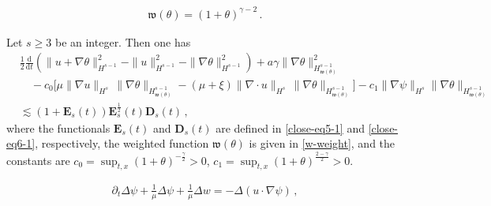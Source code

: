 \documentclass[10pt,a4paper]{amsart}
\def\d{\mathrm{d}}
\def\w{\mathfrak{w}}
\begin{document}
\begin{equation}\label{w-weight}
  \begin{aligned}
    \w (\theta) = (1 + \theta)^{\gamma - 2} \,.
  \end{aligned}
\end{equation}

\begin{lemma}\label{Lmm-G6}
    Let $s \ge 3$ be an integer. Then one has
\begin{equation}\label{theta-eq-estimate}
\begin{aligned}
&\frac{1}{2} \frac{\d}{\d t} \left( \|u + \nabla \theta\|_{H^{s-1}}^2 - \|u\|_{H^{s-1}}^2 - \|\nabla \theta\|_{H^{s-1}}^2 \right) + a \gamma \|\nabla \theta\|^2_{H^{s-1}_{\w (\theta)}} \\
& \quad - c_0 \big[ \mu \| \nabla u \|_{H^s} \, \| \nabla \theta \|_{H^{s-1}_{\w (\theta)}} - (\mu + \xi ) \| \nabla \cdot u \|_{H^s} \, \| \nabla \theta \|_{H^{s-1}_{\w (\theta)}} \big] - c_1 \|\nabla \psi\|_{H^s} \|\nabla \theta\|_{H^{s-1}_{\w (\theta)}} \\
& \lesssim \left( 1 + \mathbf{E}_s (t) \right) \mathbf{E}_s^\frac{1}{2} (t) \mathbf{D}_s (t) \,,
\end{aligned}
\end{equation}
where the functionals $\mathbf{E}_s (t)$ and $\mathbf{D}_s (t)$ are defined  in \eqref{close-eq5-1} and \eqref{close-eq6-1}, respectively, the weighted function $\w (\theta)$ is given in \eqref{w-weight}, and the constants are $c_0 = \sup_{t,x} (1 + \theta)^{- \frac{\gamma}{2}} > 0$, $c_1 = \sup_{t,x} (1 + \theta)^\frac{2 - \gamma}{2} > 0 $.
\end{lemma}

\begin{equation}\label{gpsi-eq1}
\begin{aligned}
\partial_t \Delta \psi + \frac{1}{\mu} \Delta \psi + \frac{1}{\mu} \Delta w = -\Delta \left( u \cdot \nabla \psi \right) \,,
\end{aligned}
\end{equation}
\end{document}
